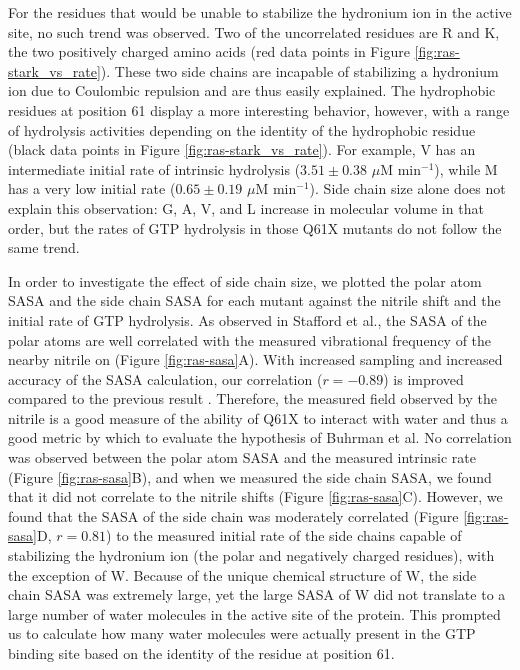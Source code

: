 For the residues that would be unable to stabilize the hydronium ion in the active site, no such trend was observed. 
Two of the uncorrelated residues are R and K, the two positively charged amino acids (red data points in Figure \ref{fig:ras-stark_vs_rate}). 
These two side chains are incapable of stabilizing a hydronium ion due to Coulombic repulsion and are thus easily explained. 
The hydrophobic residues at position 61 display a more interesting behavior, however, with a range of hydrolysis activities depending on the identity of the hydrophobic residue (black data points in Figure \ref{fig:ras-stark_vs_rate}). 
For example, V has an intermediate initial rate of intrinsic hydrolysis ($3.51 \pm 0.38$ $\mu$M min$^{-1}$), while M has a very low initial rate ($0.65 \pm 0.19$ $\mu$M min$^{-1}$).  
Side chain size alone does not explain this observation: G, A, V, and L increase in molecular volume in that order, but the rates of GTP hydrolysis in those Q61X mutants do not follow the same trend.

In order to investigate the effect of side chain size, we plotted the polar atom SASA and the side chain SASA for each mutant against the nitrile shift and the initial rate of GTP hydrolysis. 
As observed in Stafford et al., the SASA of the polar atoms are well correlated with the measured vibrational frequency of the nearby nitrile on \RalBSCN{} (Figure \ref{fig:ras-sasa}A). 
With increased sampling and increased accuracy of the SASA calculation, our correlation ($r = -0.89$) is improved compared to the previous result \cite{Stafford2012}. 
Therefore, the measured field observed by the nitrile is a good measure of the ability of Q61X to interact with water and thus a good metric by which to evaluate the hypothesis of Buhrman et al. 
No correlation was observed between the polar atom SASA and the measured intrinsic rate (Figure \ref{fig:ras-sasa}B), and when we measured the side chain SASA, we found that it did not correlate to the nitrile shifts (Figure \ref{fig:ras-sasa}C). 
However, we found that the SASA of the side chain was moderately correlated (Figure \ref{fig:ras-sasa}D, $r = 0.81$) to the measured initial rate of the side chains capable of stabilizing the hydronium ion (the polar and negatively charged residues), with the exception of W. 
Because of the unique chemical structure of W, the side chain SASA was extremely large, yet the large SASA of W did not translate to a large number of water molecules in the active site of the protein. 
This prompted us to calculate how many water molecules were actually present in the GTP binding site based on the identity of the residue at position 61.


